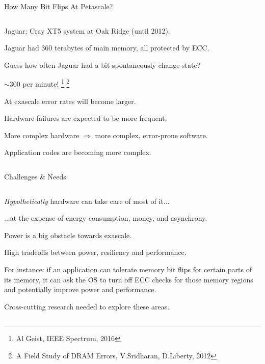 \begin{frame}{How Many Bit Flips At Petascale?}

\begin{columns}
\hspace{-1cm}
\begin{column}{1.0\textwidth}
\bi
\item Jaguar: Cray XT5 system at Oak Ridge (until 2012).
%
\ssk
\item Jaguar had 360 terabytes of main memory, 
all protected by ECC.
%
\ssk
\item Guess how often Jaguar had a bit spontaneously change state?
\vspace{-0.3cm}
\begin{center}
\item[] {\large $\sim 300$ per minute!
\footnote{Al Geist, IEEE Spectrum, 2016}
\footnote{A Field Study of DRAM Errors, V.Sridharan, D.Liberty, 2012}
}
\end{center}
%
\ssk
\item At exascale error rates will become larger. 
\bi
\item Hardware failures are expected to be more frequent.
\ssk
\item More complex hardware $\Rightarrow$ more complex, 
error-prone software.
\ssk
\item Application codes are becoming more complex.
\ei
\ei
%
\end{column}
\end{columns}
%
\end{frame}







\begin{frame}{Challenges \& Needs}
%
%
\begin{columns}
%
\begin{column}{1.1\textwidth}
\bi
\item {\it Hypothetically} hardware can take care of most of it...

\bbk
\item ...at the expense of energy consumption, money, 
and asynchrony.

\bbk
\item Power is a big obstacle towards exascale. 

\bbk
\item High tradeoffs between power, resiliency 
and performance. 
\ssk
\item[] For instance: if an application can tolerate memory bit flips for 
certain parts of its memory, it can ask the OS to turn off ECC checks for 
those memory regions and potentially improve power and performance.

\bbk
\item Cross-cutting research needed to explore these areas.
\ei
\end{column}
\end{columns}
\end{frame}







